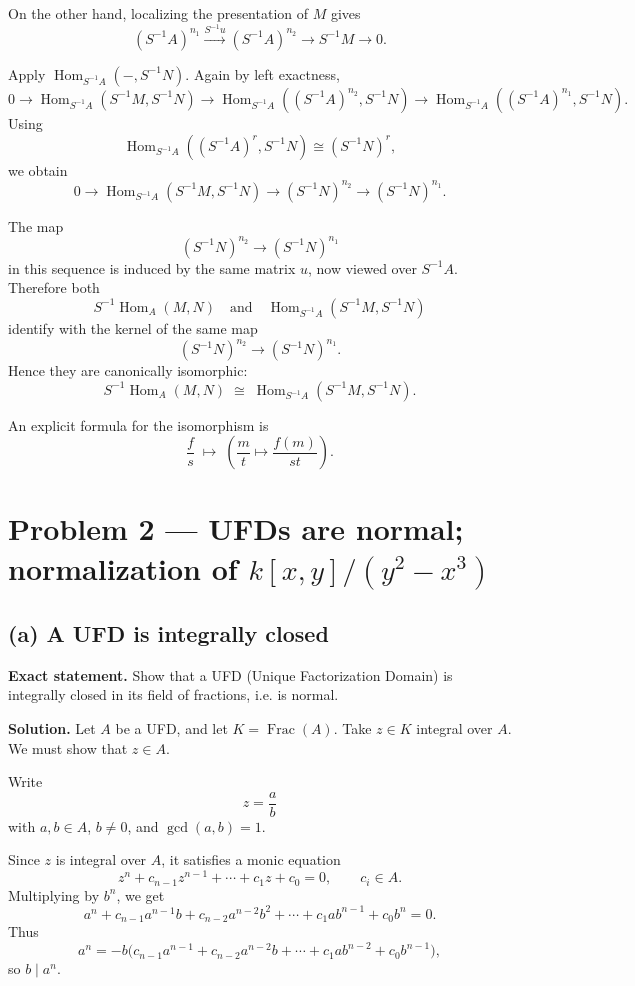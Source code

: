 \documentclass[12pt,a4paper]{article}
\theoremstyle{notespace}
\begin{document}
On the other hand, localizing the presentation of \(M\) gives
\[
(S^{-1}A)^{n_1}\xrightarrow{S^{-1}u}(S^{-1}A)^{n_2}\to S^{-1}M\to 0.
\]

Apply \(\operatorname{Hom}_{S^{-1}A}(-,S^{-1}N)\). Again by left exactness,
\[
0\to \operatorname{Hom}_{S^{-1}A}(S^{-1}M,S^{-1}N)\to
\operatorname{Hom}_{S^{-1}A}((S^{-1}A)^{n_2},S^{-1}N)\to
\operatorname{Hom}_{S^{-1}A}((S^{-1}A)^{n_1},S^{-1}N).
\]
Using
\[
\operatorname{Hom}_{S^{-1}A}((S^{-1}A)^r,S^{-1}N)\cong (S^{-1}N)^r,
\]
we obtain
\[
0\to \operatorname{Hom}_{S^{-1}A}(S^{-1}M,S^{-1}N)\to
(S^{-1}N)^{n_2}\to (S^{-1}N)^{n_1}.
\]

The map
\[
(S^{-1}N)^{n_2}\to (S^{-1}N)^{n_1}
\]
in this sequence is induced by the same matrix \(u\), now viewed over \(S^{-1}A\). Therefore both
\[
S^{-1}\operatorname{Hom}_A(M,N)
\quad\text{and}\quad
\operatorname{Hom}_{S^{-1}A}(S^{-1}M,S^{-1}N)
\]
identify with the kernel of the same map
\[
(S^{-1}N)^{n_2}\to (S^{-1}N)^{n_1}.
\]
Hence they are canonically isomorphic:
\[
S^{-1}\!\operatorname{Hom}_A(M,N)\;\cong\;\operatorname{Hom}_{S^{-1}A}(S^{-1}M,S^{-1}N).
\]

An explicit formula for the isomorphism is
\[
\frac{f}{s}\;\longmapsto\;\left(\frac{m}{t}\mapsto \frac{f(m)}{st}\right).
\]

\bigskip

\section{Problem 2 --- UFDs are normal; normalization of \texorpdfstring{$k[x,y]/(y^2-x^3)$}{k[x,y]/(y\string^2-x\string^3)}}

\subsection*{(a) A UFD is integrally closed}

\textbf{Exact statement.}
Show that a UFD (Unique Factorization Domain) is integrally closed in its field of fractions, i.e. is normal.

\textbf{Solution.}
Let \(A\) be a UFD, and let \(K=\operatorname{Frac}(A)\). Take \(z\in K\) integral over \(A\). We must show that \(z\in A\).

Write
\[
z=\frac{a}{b}
\]
with \(a,b\in A\), \(b\neq 0\), and \(\gcd(a,b)=1\).

Since \(z\) is integral over \(A\), it satisfies a monic equation
\[
z^n+c_{n-1}z^{n-1}+\cdots+c_1z+c_0=0,
\qquad c_i\in A.
\]
Multiplying by \(b^n\), we get
\[
a^n+c_{n-1}a^{n-1}b+c_{n-2}a^{n-2}b^2+\cdots+c_1ab^{n-1}+c_0b^n=0.
\]
Thus
\[
a^n=-b\big(c_{n-1}a^{n-1}+c_{n-2}a^{n-2}b+\cdots+c_1ab^{n-2}+c_0b^{n-1}\big),
\]
so \(b\mid a^n\).
\end{document}
